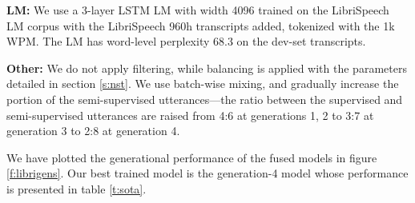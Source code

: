 \documentclass[a4paper]{article}
\begin{document}
\noindent\textbf{LM:} We use a 3-layer LSTM LM with width 4096 trained on the LibriSpeech LM corpus with the LibriSpeech 960h transcripts added, tokenized with the 1k WPM. The LM has word-level perplexity 68.3 on the dev-set transcripts.

\noindent\textbf{Other:} We do not apply filtering, while balancing is applied with the parameters detailed in section \ref{s:nst}. We use batch-wise mixing, and gradually increase the portion of the semi-supervised utterances---the ratio between the supervised and semi-supervised utterances are raised from 4:6 at generations 1, 2 to 3:7 at generation 3 to 2:8 at generation 4.

We have plotted the generational performance of the fused models in figure \ref{f:librigens}. Our best trained model is the generation-4 model whose performance is presented in table \ref{t:sota}.

\begin{table}[h!]
  \vskip -0.05in
  \caption{LibriSpeech 960h WERs (\%).}
  \label{t:sota}
  \vskip -0.05in
  \centering
  \small
  \vskip -0.1in
\end{table}
\end{document}
